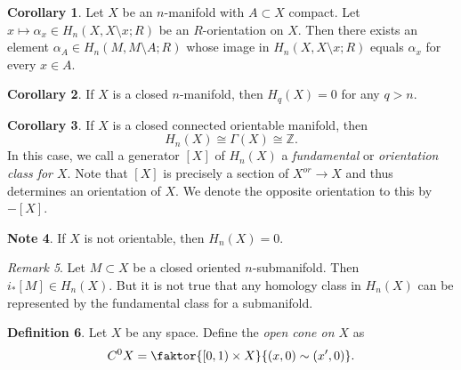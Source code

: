 \documentclass[10pt,letterpaper,cm]{nupset}
\theoremstyle{definition}
\newtheorem{definition}{Definition}[subsection]
\newtheorem{note}[definition]{Note}
\theoremstyle{theorem}
\newtheorem{corollary}[definition]{Corollary}
\theoremstyle{remark}
\newtheorem{remark}[definition]{Remark}
\newcommand{\Z}{\mathbb Z}
\newcommand{\1}{\mathbb{1}}
\newcommand{\0}{\vec 0}
\begin{document}
\begin{corollary}
Let $X$ be an $n$-manifold with $A \subset X$ compact. Let $x \mapsto \alpha_x \in H_n(X, X \setminus x; R)$ be an $R$-orientation on $X$. Then there exists an element  $\alpha_A \in H_n(M, M \setminus A; R)$ whose image in $H_n(X, X \setminus x; R)$ equals $\alpha_x$ for every $x\in A$.
\end{corollary}

\begin{corollary}
If $X$ is a closed $n$-manifold, then $H_q(X) = 0$ for any $q>n$. 
\end{corollary}

\begin{corollary}
If $X$ is a closed connected  orientable manifold, then $$H_n(X) \cong \Gamma(X) \cong \Z.$$ In this case, we call a generator $[X]$ of $H_n(X)$ a \textit{fundamental} or \textit{orientation class for $X$}. Note that $[X]$ is precisely a section of $X^{or} \to X$ and thus determines an orientation of $X$. We denote the opposite orientation to this by ${-}[X]$.
\end{corollary}

\begin{note}
If $X$ is not orientable, then $H_n(X) =0$. 
\end{note}

\begin{remark}
Let $M \subset X$ be a closed oriented $n$-submanifold. Then $i_{\ast}{[M]} \in H_n(X)$. But it is not true that any homology class in $H_n(X)$ can be represented by the fundamental class for a submanifold.   
\end{remark}

\begin{definition}
Let $X$ be any space. Define the \textit{open cone on $X$} as $$C^0{X} =\faktor{[0,1) \times X}{(x,0) \sim (x',0)} .$$
\end{definition}
\end{document}

